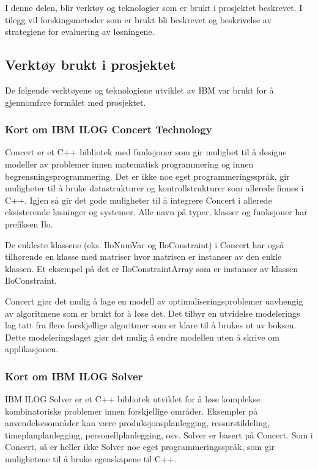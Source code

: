 I denne delen, blir verktøy og teknologier som er brukt i prosjektet beskrevet. I tilegg vil forskingsmetoder som er brukt bli beskrevet og beskrivelse av strategiene for evaluering av løsningene.

\subsection{Verktøy brukt i prosjektet}
De følgende verktøyene og teknologiene utviklet av IBM var brukt for å gjennomføre formålet med prosjektet.

\subsubsection{Kort om IBM ILOG Concert Technology}
Concert er et C++ bibliotek med funksjoner som gir mulighet til å designe modeller av problemer innen matematisk programmering og innen begrensningsprogrammering. Det er ikke noe eget programmeringsspråk, gir muligheter til å bruke datastrukturer og kontrollstrukturer som allerede finnes i C++. Igjen så gir det gode muligheter til å integrere Concert i allerede eksisterende løsninger og systemer. Alle navn på typer, klasser og funksjoner har prefiksen Ilo.

De enkleste klassene (eks. IloNumVar og IloConstraint) i Concert har også tilhørende en klasse med matriser hvor matrisen er instanser av den enkle klassen. Et eksempel på det er IloConstraintArray som er instanser av klassen IloConstraint.\cite{cpconcertilog}

Concert gjør det mulig å lage en modell av optimaliseringsproblemer uavhengig av algoritmene som er brukt for å løse det. Det tilbyr en utvidelse modelerings lag tatt fra flere forskjellige algoritmer som er klare til å brukes ut av boksen. Dette modeleringslaget gjør det mulig å endre modellen uten å skrive om applikasjonen.\cite{cpsolverilog}

\subsubsection{Kort om IBM ILOG Solver}
IBM ILOG Solver er et C++ bibliotek utviklet for å løse komplekse kombinatoriske problemer innen forskjellige områder. Eksempler på anvendelsesområder kan være produksjonsplanlegging, ressurstildeling, timeplanplanlegging, personellplanlegging, osv. Solver er basert på Concert. Som i Concert, så er heller ikke Solver noe eget programmeringsspråk, som gir mulighetene til å bruke egenskapene til C++.

